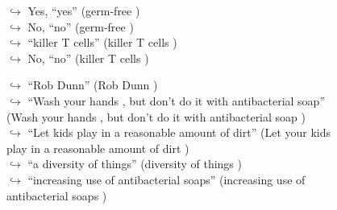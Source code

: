 \documentclass[11pt,a4paper, onecolumn]{article}
\begin{document}
\begin{figure}[t]
\begin{tcolorbox}[boxsep=0pt,left=5pt,right=0pt,top=2pt,colback = yellow!5]
\begin{dialogue}
\colorbox{pink!25}{$\hookrightarrow$}
\colorbox{red!25}{Yes,}
{ ``yes'' (germ-free ) }
\\
\colorbox{pink!25}{$\hookrightarrow$}
\colorbox{red!25}{No,}
{ ``no'' (germ-free ) }
\\
\colorbox{pink!25}{$\hookrightarrow$}
{ ``killer T cells'' (killer T cells ) }
\\
\colorbox{pink!25}{$\hookrightarrow$}
\colorbox{red!25}{No,}
{ ``no'' (killer T cells ) }
\\
 \end{dialogue}\end{tcolorbox}\end{figure}\begin{figure}[t] \small \begin{tcolorbox}[boxsep=0pt,left=5pt,right=0pt,top=2pt,colback = yellow!5] \begin{dialogue}
 \small 
\colorbox{pink!25}{$\hookrightarrow$}
{ ``Rob Dunn'' (Rob Dunn ) }
\\
\colorbox{pink!25}{$\hookrightarrow$}
{ ``Wash your hands , but don't do it with antibacterial soap'' (Wash your hands , but don't do it with antibacterial soap ) }
\\
\colorbox{pink!25}{$\hookrightarrow$}
{ ``Let kids play in a reasonable amount of dirt'' (Let your kids play in a reasonable amount of dirt ) }
\\
\colorbox{pink!25}{$\hookrightarrow$}
{ ``a diversity of things'' (diversity of things ) }
\\
\colorbox{pink!25}{$\hookrightarrow$}
{ ``increasing use of antibacterial soaps'' (increasing use of antibacterial soaps ) }
\\
 \end{dialogue}\end{tcolorbox}\end{figure}
\end{document}
